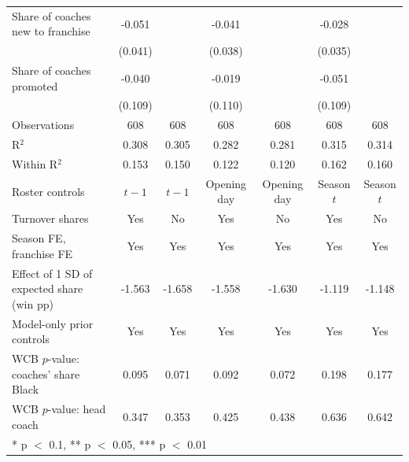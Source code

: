 \begin{table}[H]
{\begin{tabular}[t]{lcccccc}
Share of coaches new to franchise & -0.051 &  & -0.041 &  & -0.028 & \\
 & (0.041) &  & (0.038) &  & (0.035) & \\
Share of coaches promoted & -0.040 &  & -0.019 &  & -0.051 & \\
 & (0.109) &  & (0.110) &  & (0.109) & \\
\midrule
Observations & 608 & 608 & 608 & 608 & 608 & 608\\
R$^2$ & 0.308 & 0.305 & 0.282 & 0.281 & 0.315 & 0.314\\
Within R$^2$ & 0.153 & 0.150 & 0.122 & 0.120 & 0.162 & 0.160\\
Roster controls & $t-1$ & $t-1$ & Opening day & Opening day & Season $t$ & Season $t$\\
Turnover shares & Yes & No & Yes & No & Yes & No\\
Season FE, franchise FE & Yes & Yes & Yes & Yes & Yes & Yes\\
Effect of 1 SD of expected share (win pp) & -1.563 & -1.658 & -1.558 & -1.630 & -1.119 & -1.148\\
Model-only prior controls & Yes & Yes & Yes & Yes & Yes & Yes\\
WCB $p$-value: coaches' share Black & 0.095 & 0.071 & 0.092 & 0.072 & 0.198 & 0.177\\
WCB $p$-value: head coach & 0.347 & 0.353 & 0.425 & 0.438 & 0.636 & 0.642\\
\bottomrule
\multicolumn{7}{l}{\rule{0pt}{1em}* p $<$ 0.1, ** p $<$ 0.05, *** p $<$ 0.01}\\
\end{tabular}}
\end{table}

